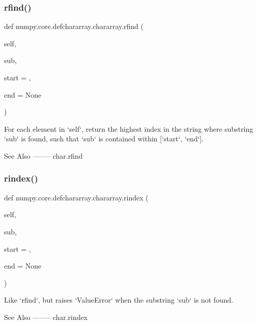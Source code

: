 \subsubsection{\texorpdfstring{rfind()}{rfind()}}
{\footnotesize\ttfamily def numpy.\+core.\+defchararray.\+chararray.\+rfind (\begin{DoxyParamCaption}\item[{}]{self,  }\item[{}]{sub,  }\item[{}]{start = {},  }\item[{}]{end = {\ttfamily None} }\end{DoxyParamCaption})}

\begin{DoxyVerb}For each element in `self`, return the highest index in the string
where substring `sub` is found, such that `sub` is contained
within [`start`, `end`].

See Also
--------
char.rfind\end{DoxyVerb}
 \mbox{\label{classnumpy_1_1core_1_1defchararray_1_1chararray_a669f4b13f8b74841b6499fb1632616b8}} 
\subsubsection{\texorpdfstring{rindex()}{rindex()}}
{\footnotesize\ttfamily def numpy.\+core.\+defchararray.\+chararray.\+rindex (\begin{DoxyParamCaption}\item[{}]{self,  }\item[{}]{sub,  }\item[{}]{start = {},  }\item[{}]{end = {\ttfamily None} }\end{DoxyParamCaption})}

\begin{DoxyVerb}Like `rfind`, but raises `ValueError` when the substring `sub` is
not found.

See Also
--------
char.rindex\end{DoxyVerb}
 \mbox{\label{classnumpy_1_1core_1_1defchararray_1_1chararray_a48735eefda75be92386355cae71b5dfe}} 
